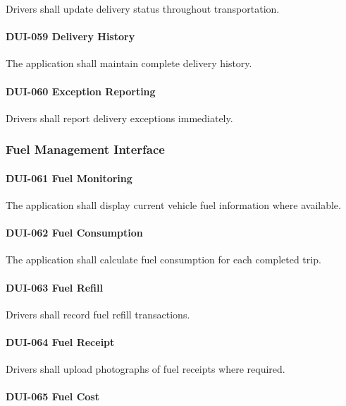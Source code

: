 Drivers shall update delivery status throughout transportation.

\paragraph{DUI-059 Delivery History}

The application shall maintain complete delivery history.

\paragraph{DUI-060 Exception Reporting}

Drivers shall report delivery exceptions immediately.


\subsubsection*{Fuel Management Interface}

\paragraph{DUI-061 Fuel Monitoring}

The application shall display current vehicle fuel information where
available.

\paragraph{DUI-062 Fuel Consumption}

The application shall calculate fuel consumption for each completed
trip.

\paragraph{DUI-063 Fuel Refill}

Drivers shall record fuel refill transactions.

\paragraph{DUI-064 Fuel Receipt}

Drivers shall upload photographs of fuel receipts where required.

\paragraph{DUI-065 Fuel Cost}

